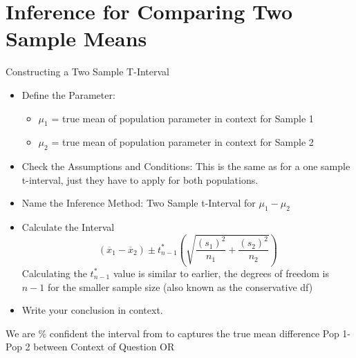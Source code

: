 \documentclass[../stats.tex]{subfiles}
\begin{document}
\section{Inference for Comparing Two Sample Means}
Constructing a Two Sample T-Interval 
\begin{itemize}
    \item Define the Parameter:
    \begin{itemize}
        \item $\mu_1$ = true mean of {population parameter in context} for {Sample 1}
        \item $\mu_2$ = true mean of {population parameter in context} for {Sample 2}
    \end{itemize}
    \item Check the Assumptions and Conditions: This is the same as for a one sample t-interval, just they have to apply for both populations.
    \item Name the Inference Method: Two Sample t-Interval for $\mu_1-\mu_2$
    \item Calculate the Interval 
    \[ (\overline{x}_1-\overline{x}_2)\pm t_{n-1}^* \left(\sqrt{\frac{(s_1)^2}{n_1}+\frac{(s_2)^2}{n_2}}  \right) \]
    Calculating the $t_{n-1}^*$ value is similar to earlier, the degrees of freedom is $n-1$ for the smaller sample size (also known as the conservative df)
\end{itemize}
\begin{itemize}
    \item Write your conclusion in context.
\end{itemize}
We are \blank \% confident the interval from \blank to  captures the true mean difference {Pop 1-Pop 2} between {Context of Question} OR 
\end{document}

